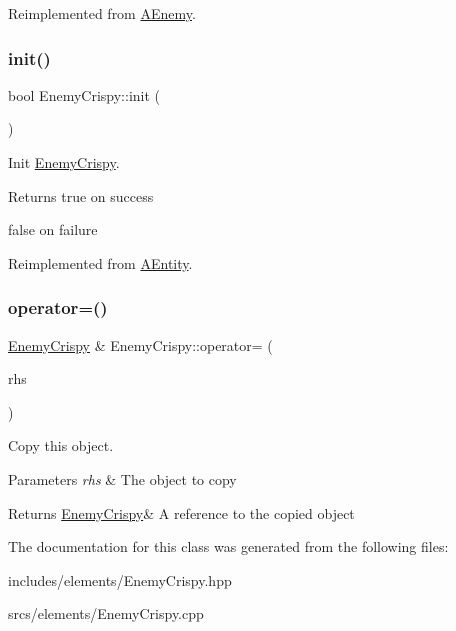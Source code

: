 Reimplemented from \hyperlink{class_a_enemy_ac946b6cd7d96f99365301450566d3baf}{A\+Enemy}.

\mbox{\label{class_enemy_crispy_a87a926e52fd94e7307baaad8cb1b4977}} 
\subsubsection{\texorpdfstring{init()}{init()}}
{\footnotesize\ttfamily bool Enemy\+Crispy\+::init (\begin{DoxyParamCaption}{ }\end{DoxyParamCaption})\hspace{0.3cm}{\ttfamily [virtual]}}



Init \hyperlink{class_enemy_crispy}{Enemy\+Crispy}. 

\begin{DoxyReturn}{Returns}
true on success 

false on failure 
\end{DoxyReturn}


Reimplemented from \hyperlink{class_a_entity_a450361b684fa02e4ffe0ba406b8e3b30}{A\+Entity}.

\mbox{\label{class_enemy_crispy_ab91c7b22982054521158b56b4bea1d4c}} 
\subsubsection{\texorpdfstring{operator=()}{operator=()}}
{\footnotesize\ttfamily \hyperlink{class_enemy_crispy}{Enemy\+Crispy} \& Enemy\+Crispy\+::operator= (\begin{DoxyParamCaption}\item[{\hyperlink{class_enemy_crispy}{Enemy\+Crispy} const \&}]{rhs }\end{DoxyParamCaption})}



Copy this object. 


\begin{DoxyParams}{Parameters}
{\em rhs} & The object to copy \\
\hline
\end{DoxyParams}
\begin{DoxyReturn}{Returns}
\hyperlink{class_enemy_crispy}{Enemy\+Crispy}\& A reference to the copied object 
\end{DoxyReturn}


The documentation for this class was generated from the following files\+:\begin{DoxyCompactItemize}
\item 
includes/elements/Enemy\+Crispy.\+hpp\item 
srcs/elements/Enemy\+Crispy.\+cpp\end{DoxyCompactItemize}
